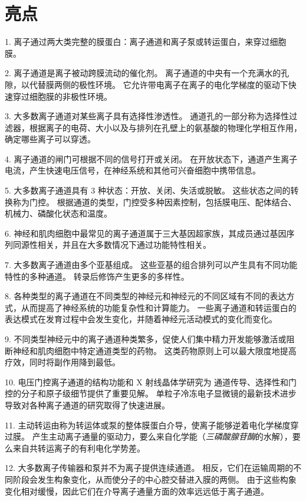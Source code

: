 \section{亮点}


1. 离子通过两大类完整的膜蛋白：离子通道和离子泵或转运蛋白，来穿过细胞膜。


2. 离子通道是离子被动跨膜流动的催化剂。
离子通道的中央有一个充满水的孔隙，以代替膜两侧的极性环境。
它允许带电离子在离子的电化学梯度的驱动下快速穿过细胞膜的非极性环境。


3. 大多数离子通道对某些离子具有选择性渗透性。
通道孔的一部分称为选择性过滤器，根据离子的电荷、大小以及与排列在孔壁上的氨基酸的物理化学相互作用，确定哪些离子可以穿透。


4. 离子通道的闸门可根据不同的信号打开或关闭。
在开放状态下，通道产生离子电流，产生快速电压信号，在神经系统和其他可兴奋细胞中携带信息。


5. 大多数离子通道具有 3 种状态：开放、关闭、失活或脱敏。
这些状态之间的转换称为门控。
根据通道的类型，门控受多种因素控制，包括膜电压、配体结合、机械力、磷酸化状态和温度。


6. 神经和肌肉细胞中最常见的离子通道属于三大基因超家族，其成员通过基因序列同源性相关，并且在大多数情况下通过功能特性相关。


7. 大多数离子通道由多个亚基组成。
这些亚基的组合排列可以产生具有不同功能特性的多种通道。
转录后修饰产生更多的多样性。


8. 各种类型的离子通道在不同类型的神经元和神经元的不同区域有不同的表达方式，从而提高了神经系统的功能复杂性和计算能力。
一些离子通道和转运蛋白的表达模式在发育过程中会发生变化，并随着神经元活动模式的变化而变化。


9. 不同类型神经元中的离子通道种类繁多，促使人们集中精力开发能够激活或阻断神经和肌肉细胞中特定通道类型的药物。
这类药物原则上可以最大限度地提高疗效，同时将副作用降到最低。


10. 电压门控离子通道的结构功能和 X 射线晶体学研究为  通道传导、选择性和门控的分子和原子级细节提供了重要见解。
单粒子冷冻电子显微镜的最新技术进步导致对各种离子通道的研究取得了快速进展。


11. 主动转运由称为转运体或泵的整体膜蛋白介导，使离子能够逆着电化学梯度穿过膜。
产生主动离子通量的驱动力，要么来自化学能（\textit{三磷酸腺苷酶}的水解），要么来自共转运离子的有利电化学势差。


12. 大多数离子传输器和泵并不为离子提供连续通道。
相反，它们在运输周期的不同阶段会发生构象变化，从而使分子的中心腔交替进入膜的两侧。
由于这些构象变化相对缓慢，因此它们在介导离子通量方面的效率远远低于离子通道。



